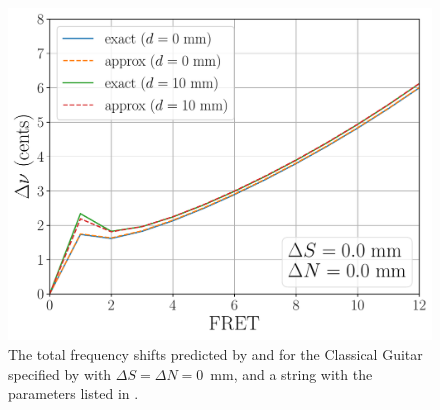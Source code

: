 \begin{figure}
  \centering
  \includegraphics[width=5.0in]{figures/uncomp}
  \caption{\label{fig:uncomp} The total frequency shifts predicted by  and  for the Classical Guitar specified by  with $\Delta S = \Delta N = 0$~mm, and a string with the parameters listed in .}
\end{figure}

